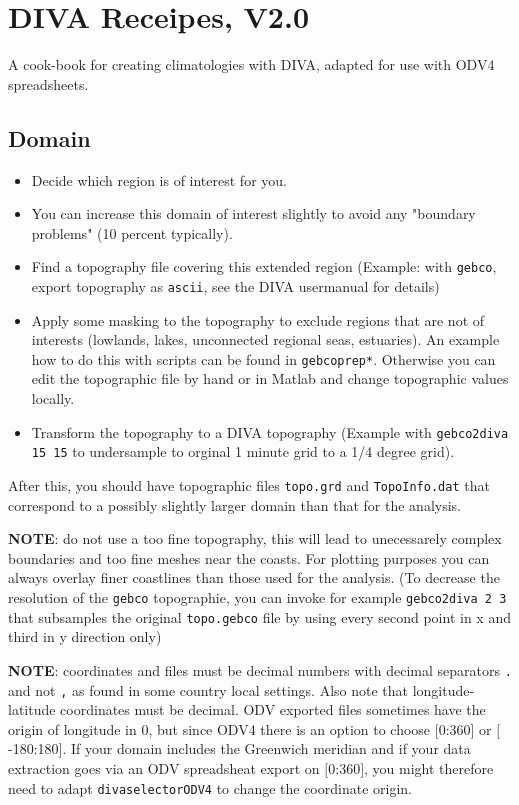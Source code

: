 \documentclass[8pt,a4paper,notitlepage]{book}
\newcommand{\diva}{DIVA}
\newcommand{\Diva}{DIVA}
\begin{document}
\chapter{DIVA Receipes, V2.0}


A cook-book for creating climatologies with \Diva, adapted for use with ODV4 spreadsheets.


\section{Domain}

\begin{itemize}
\item Decide which region is of interest for you. 
\item You can increase this domain of interest slightly to avoid any "boundary problems" (10 percent typically).
\item Find a topography file covering this extended region (Example: with {\tt gebco}, export topography as {\tt ascii}, see the {\diva} usermanual for details)
\item Apply some masking to the topography to exclude regions that are not of interests (lowlands, lakes, unconnected regional seas, estuaries). An example how to do this with scripts can be found in {\tt gebcoprep*}. Otherwise you can edit the topographic file by hand or in Matlab and change topographic values locally.
\item Transform the topography to a {\diva}   topography (Example with {\tt gebco2diva 15 15} to undersample to orginal 1 minute grid to a 1/4 degree grid).
\end{itemize}

After this, you should have topographic files {\tt topo.grd} and {\tt TopoInfo.dat} that correspond to a possibly slightly larger domain than that for the analysis.


{\bf NOTE}: do not use a too fine topography, this will lead to unecessarely complex boundaries and too fine meshes near the coasts. For plotting purposes you can always overlay finer coastlines than those used for the analysis.
(To decrease the resolution of the {\tt gebco} topographie, you can invoke for example {\tt gebco2diva 2 3} that subsamples the original {\tt topo.gebco} file  by using every second point in x and third in y direction only)

{\bf NOTE}: coordinates and files must be decimal numbers with decimal separators {\tt .} and not {\tt ,} as found in some country local settings. Also note that longitude-latitude coordinates must be decimal. ODV exported files sometimes have the origin of longitude in 0, but since ODV4 there is an option to choose $[$0:360$]$ or $[$-180:180$]$. If your domain includes the Greenwich meridian and if your data extraction goes via an ODV spreadsheat export on $[$0:360$]$, you might therefore need to adapt {\tt divaselectorODV4} to change the coordinate origin.
\end{document}
